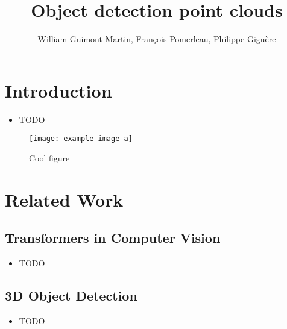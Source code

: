 \documentclass[letterpaper, 10 pt, conference]{ieeeconf}  %
\title{\LARGE \bf 
    Object detection point clouds
}
\author{William Guimont-Martin, François Pomerleau, Philippe Giguère
}
\begin{document}
\maketitle
\thispagestyle{empty}
\pagestyle{empty}

\begin{abstract}

\lightlipsum[1-1]

\end{abstract}

\section{Introduction}

\begin{itemize}
    \item TODO
\end{itemize}

\lightlipsum[1-1]

\begin{figure}[htbp]
    \centering
    \texttt{[image: example-image-a]}
    \caption{Cool figure}
    \label{fig:a}
\end{figure}

\lightlipsum[1-4]

\section{Related Work}

\lightlipsum[1]

\subsection{Transformers in Computer Vision}

\begin{itemize}
    \item TODO
\end{itemize}

\lightlipsum[1-2]

\subsection{3D Object Detection}

\begin{itemize}
    \item TODO
\end{itemize}
\end{document}
